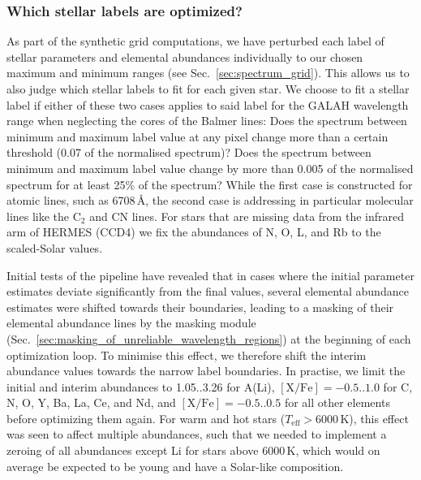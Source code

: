 \documentclass[
  journal=pasa,
  manuscript=research-paper, %
  year=2024,
  volume=37
]{cup-journal}
\newcommand\ion[2]{\text{#1\,\textsc{\lowercase{#2}}}}	%
\newcommand{\K}{\,\mathrm{K}}	%
\begin{document}
\subsubsection{Which stellar labels are optimized?} \label{sec:which_labels_are_optimized}


As part of the synthetic grid computations, we have perturbed each label of stellar parameters and elemental abundances individually to our chosen maximum and minimum ranges (see Sec.~\ref{sec:spectrum_grid}). This allows us to also judge which stellar labels to fit for each given star. We choose to fit a stellar label if either of these two cases applies to said label for the GALAH wavelength range when neglecting the cores of the Balmer lines: Does the spectrum between minimum and maximum label value at any pixel change more than a certain threshold (0.07 of the normalised spectrum)? Does the spectrum between minimum and maximum label value change by more than 0.005 of the normalised spectrum for at least 25\% of the spectrum? While the first case is constructed for atomic lines, such as \ion{Li}{i} 6708\,\AA, the second case is addressing in particular molecular lines like the $\mathrm{C_2}$ and $\mathrm{CN}$ lines. For stars that are missing data from the infrared arm of HERMES (CCD4) we fix the abundances of N, O, L, and Rb to the scaled-Solar values.

Initial tests of the pipeline have revealed that in cases where the initial parameter estimates deviate significantly from the final values, several elemental abundance estimates were shifted towards their boundaries, leading to a masking of their elemental abundance lines by the masking module (Sec.~\ref{sec:masking_of_unreliable_wavelength_regions}) at the beginning of each optimization loop. To minimise this effect, we therefore shift the interim abundance values towards the narrow label boundaries. In practise, we limit the initial and interim abundances to 1.05..3.26 for A(Li), $\mathrm{[X/Fe]} = -0.5..1.0$ for C, N, O, Y, Ba, La, Ce, and Nd, and $\mathrm{[X/Fe]} = -0.5..0.5$ for all other elements before optimizing them again. For warm and hot stars ($T_\text{eff} > 6000\K$), this effect was seen to affect multiple abundances, such that we needed to implement a zeroing of all abundances except Li for stars above $6000\K$, which would on average be expected to be young and have a Solar-like composition.
\end{document}
